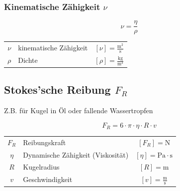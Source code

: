 \subsubsection{Kinematische Zähigkeit $\nu$}

$$ \boxed{ \nu = \frac{\eta}{\rho}  } $$

\begin{tabular}{c l c}
		\rule{0pt}{8pt}$\nu$ & kinematische Zähigkeit & $[\nu] = \mathrm{\frac{m^2}{s}}$ \\
		\rule{0pt}{8pt}$\rho$ & Dichte & $[\rho] = \mathrm{\frac{kg}{m^3}}$  \\	
\end{tabular}
	

	
\subsection{Stokes'sche Reibung $F_R$}
Z.B. für Kugel in Öl oder fallende Wassertropfen

$$ \boxed{ F_R = 6 \cdot \pi \cdot \eta \cdot R \cdot v } $$

\begin{tabular}{c l c}
		$F_R$ & Reibungskraft & $[F_R] = \mathrm{N}$ \\
		$\eta$ & Dynamische Zähigkeit (Viskosität) & $[\eta] = \mathrm{Pa \cdot s}$  \\
		$R$ & Kugelradius & $[R] = \mathrm{m}$ \\
		\rule{0pt}{8pt}$v$ & Geschwindigkeit & $[v] = \mathrm{\frac{m}{s}}$		
\end{tabular}


